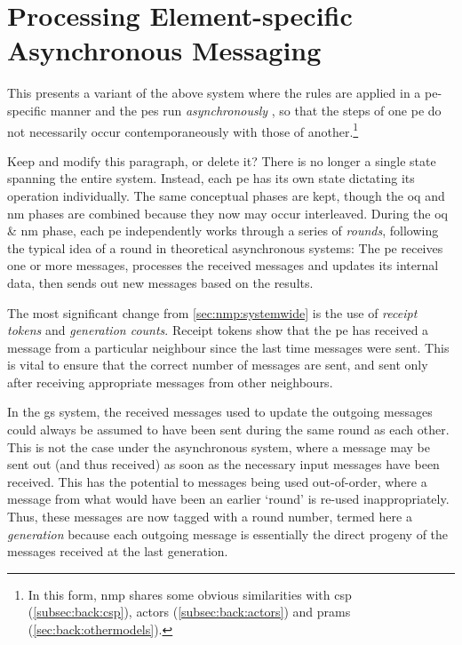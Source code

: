 \section{\label{sec:nmp:pespecific}Processing Element-specific Asynchronous Messaging}

This  presents a variant of the above system where the rules are applied in a \gls{pe}-specific manner and the \glspl{pe} run \emph{asynchronously} \cite{Balanescu2011,Nicolescu2014}, so that the steps of one \gls{pe} do not necessarily occur contemporaneously with those of another.\footnote{In this form, \gls{nmp} shares some obvious similarities with \Gls{csp} (\cref{subsec:back:csp}), \Glspl{actor} (\cref{subsec:back:actors}) and \Glspl{pram} (\cref{sec:back:othermodels}).}  

\begin{anfxwarning}{Keep and modify this paragraph, or delete it?}
There is no longer a single state spanning the entire system.  Instead, each \gls{pe} has its own state dictating its operation individually.  The same conceptual phases are kept, though the \gls{oq} and \gls{nm} phases are combined because they now may occur interleaved.  During the \gls{oq} \& \gls{nm} phase, each \gls{pe} independently works through a series of \label{pg:nmp:rounds}\emph{rounds}, following the typical idea of a round in theoretical asynchronous systems:  The \gls{pe} receives one or more messages, processes the received messages and updates its internal data, then sends out new messages based on the results.
\end{anfxwarning}

The most significant change from \cref{sec:nmp:systemwide} is the use of \emph{receipt tokens} and \emph{generation counts}.  Receipt tokens show that the \gls{pe} has received a message from a particular neighbour since the last time messages were sent.  This is vital to ensure that the correct number of messages are sent, and sent only after receiving appropriate messages from other neighbours.

In the \gls{gs} system, the received messages used to update the outgoing messages could always be assumed to have been sent during the same round as each other.  This is not the case under the asynchronous system, where a message may be sent out (and thus received) as soon as the necessary input messages have been received.  This has the potential to messages being used out-of-order, where a message from what would have been an earlier `round' is re-used inappropriately.  Thus, these messages are now tagged with a round number, termed here a \emph{generation} because each outgoing message is essentially the direct progeny of the messages received at the last generation.

